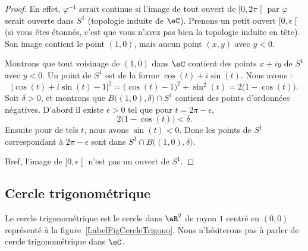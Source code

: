 \begin{proof}
	En effet, \( \varphi^{-1}\) serait continue si l'image de tout ouvert de \( \mathopen[ 0 , 2\pi \mathclose[\) par \( \varphi\) serait ouverte dans \( S^1\) (topologie induite de \( \eC\)). Prenons un petit ouvert \( \mathopen[ 0 , \epsilon \mathclose[\) (si vous êtes étonnés, c'est que vous n'avez pas bien la topologie induite en tête). Son image contient le point \( (1,0)\), mais aucun point \( (x,y)\) avec \( y<0\).

	Montrons que tout voisinage de \( (1,0)\) dans \( \eC\) contient des points \( x+iy\) de \( S^1\) avec \( y<0\). Un point de \( S^1\) est de la forme \( \cos(t)+i\sin(t)\). Nous avons :
	\begin{equation}
		| \cos(t)+i\sin(t)-1 |^2=\big( \cos(t)-1 \big)^2+\sin^2(t)=2\big( 1-\cos(t) \big).
	\end{equation}
	Soit \( \delta>0\), et montrons que \( B\big( (1,0),\delta \big)\cap S^1\) contient des points d'ordonnées négatives. D'abord il existe \( \epsilon>0\) tel que pour \( t=2\pi-\epsilon\),
	\begin{equation}
		2\big( 1-\cos(t) \big)<\delta.
	\end{equation}
	Ensuite pour de tels \( t\), nous avons \( \sin(t)<0\). Donc les points de \( S^1\) correspondant à \( 2\pi-\epsilon\) sont dans \( S^1\cap B\big( (1,0),\delta \big)\).

	Bref, l'image de \( \mathopen[ 0 , \epsilon \mathclose[\) n'est pas un ouvert de \( S^1\).
\end{proof}

\subsection{Cercle trigonométrique}

\newcommand{\CaptionFigCercleTrigono}{Le cercle trigonométrique.}


\begin{definition}
	Le cercle trigonométrique est le cercle dans \( \eR^2\) de rayon \( 1\) centré en \( (0,0)\) représenté à la figure~\ref{LabelFigCercleTrigono}. Nous n'hésiterons pas à parler de cercle trigonométrique dans \( \eC\).
\end{definition}

